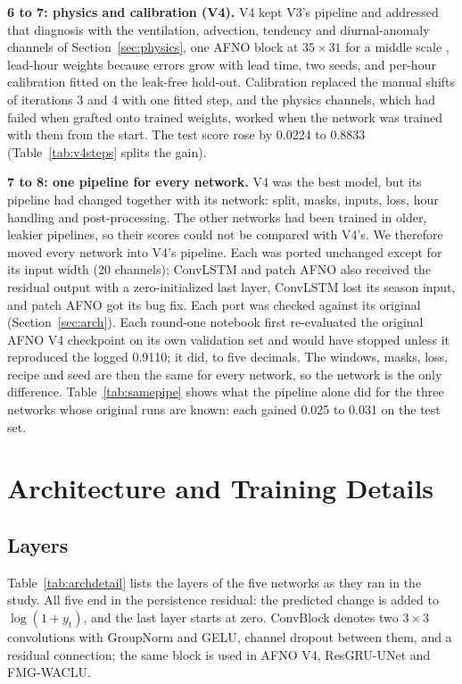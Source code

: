 \documentclass[journal]{IEEEtran}
\begin{document}
\textbf{6 to 7: physics and calibration (V4).} V4 kept V3's pipeline and addressed that diagnosis with the ventilation, advection, tendency and diurnal-anomaly channels of Section~\ref{sec:physics}, one AFNO block at $35\times31$ for a middle scale \cite{dang2025adaptfno}, lead-hour weights because errors grow with lead time, two seeds, and per-hour calibration fitted on the leak-free hold-out. Calibration replaced the manual shifts of iterations 3 and 4 with one fitted step, and the physics channels, which had failed when grafted onto trained weights, worked when the network was trained with them from the start. The test score rose by 0.0224 to 0.8833 (Table~\ref{tab:v4steps} splits the gain).

\textbf{7 to 8: one pipeline for every network.} V4 was the best model, but its pipeline had changed together with its network: split, masks, inputs, loss, hour handling and post-processing. The other networks had been trained in older, leakier pipelines, so their scores could not be compared with V4's. We therefore moved every network into V4's pipeline. Each was ported unchanged except for its input width (20 channels); ConvLSTM and patch AFNO also received the residual output with a zero-initialized last layer, ConvLSTM lost its season input, and patch AFNO got its bug fix. Each port was checked against its original (Section~\ref{sec:arch}). Each round-one notebook first re-evaluated the original AFNO V4 checkpoint on its own validation set and would have stopped unless it reproduced the logged 0.9110; it did, to five decimals. The windows, masks, loss, recipe and seed are then the same for every network, so the network is the only difference. Table~\ref{tab:samepipe} shows what the pipeline alone did for the three networks whose original runs are known: each gained 0.025 to 0.031 on the test set.

\section{Architecture and Training Details}
\label{app:arch}\label{app:runs}\label{app:cost}
\subsection{Layers}
Table~\ref{tab:archdetail} lists the layers of the five networks as they ran in the study. All five end in the persistence residual: the predicted change is added to $\log(1+y_t)$, and the last layer starts at zero. ConvBlock denotes two $3\times3$ convolutions with GroupNorm and GELU, channel dropout between them, and a residual connection; the same block is used in AFNO V4, ResGRU-UNet and FMG-WACLU.
\end{document}
